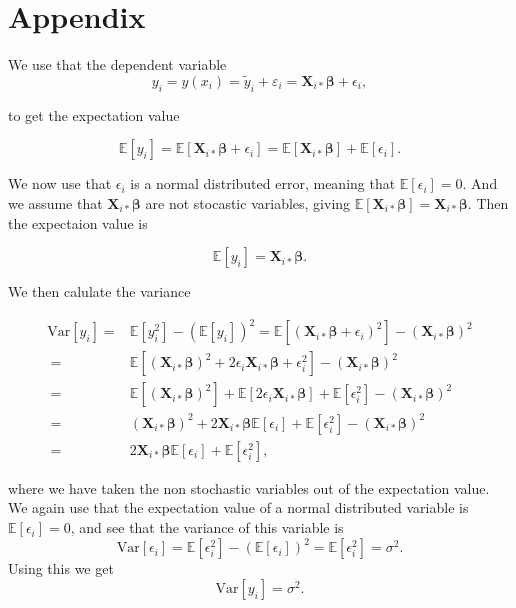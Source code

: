 \appendix
\section{Appendix}

We use that the dependent variable
$$
y_i = y(x_i) = \tilde{y}_i + \varepsilon_i = \mathbf X_{i*}\boldsymbol{\beta} + \epsilon_i,
$$

to get the expectation value



$$
\mathbb{E}[y_i] = \mathbb{E}[\mathbf X_{i*}\boldsymbol{\beta} + \epsilon_i] = \mathbb{E}[\mathbf X_{i*}\boldsymbol{\beta}] + \mathbb{E}[\epsilon_i].
$$

We now use that $\epsilon_i$ is a normal distributed error, meaning that $\mathbb{E}[\epsilon_i]=0$. And we assume that $\mathbf X_{i*}\boldsymbol{\beta}$ are not stocastic variables, giving $\mathbb{E}[\mathbf X_{i*}\boldsymbol{\beta}]=\mathbf X_{i*}\boldsymbol{\beta}$. Then the expectaion value is

\begin{equation}\label{eq:expectation_yi}
\mathbb{E}[y_i] = \mathbf X_{i*}\boldsymbol{\beta}.
\end{equation}

We then calulate the variance


\begin{align*}
\mbox{Var}[y_i] =& \mathbb{E}[y_i^2] - (\mathbb{E}[y_i])^2 = \mathbb{E}[(\mathbf X_{i*}\boldsymbol{\beta} + \epsilon_i)^2]- (\mathbf X_{i*}\boldsymbol{\beta})^2
\\
\ =& \mathbb{E}[(\mathbf X_{i*}\boldsymbol{\beta})^2+2\epsilon_i \mathbf X_{i*}\boldsymbol{\beta}+\epsilon_i^2]-(\mathbf X_{i*}\boldsymbol{\beta})^2
\\
\ =& \mathbb{E}[(\mathbf X_{i*}\boldsymbol{\beta})^2] + \mathbb{E}[2\epsilon_i \mathbf X_{i*}\boldsymbol{\beta}] + \mathbb{E}[\epsilon_i^2]-(\mathbf X_{i*}\boldsymbol{\beta})^2
\\
\ =& (\mathbf X_{i*}\boldsymbol{\beta})^2 + 2\mathbf X_{i*}\boldsymbol{\beta}\mathbb{E}[\epsilon_i ] + \mathbb{E}[\epsilon_i^2]-(\mathbf X_{i*}\boldsymbol{\beta})^2
\\
\ =& 2\mathbf X_{i*}\boldsymbol{\beta}\mathbb{E}[\epsilon_i ] + \mathbb{E}[\epsilon_i^2],
\end{align*}


where we have taken the non stochastic variables out of the expectation value. We again use that the expectation value of a normal distributed variable is $\mathbb{E}[\epsilon_i ]=0$, and see that the variance of this variable is
$$
\mbox{Var}[\epsilon_i]=\mathbb{E}[\epsilon_i^2 ]-(\mathbb{E}[\epsilon_i ])^2=\mathbb{E}[\epsilon_i^2 ]=\sigma^2.
$$
Using this we get
\begin{equation}\label{eq:var_yi}
\mbox{Var}[y_i] = \sigma^2.
\end{equation}



